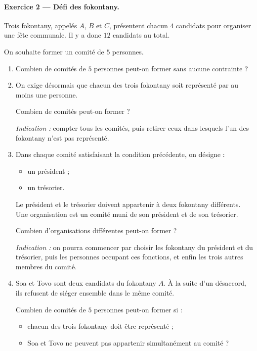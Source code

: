 \paragraph{Exercice 2 --- Défi des fokontany.}
Trois fokontany, appelés \(A\), \(B\) et \(C\), présentent chacun \(4\) candidats
pour organiser une fête communale. Il y a donc \(12\) candidats au total.

On souhaite former un comité de \(5\) personnes.

\begin{enumerate}
    \item Combien de comités de \(5\) personnes peut-on former sans aucune contrainte ?

    \item On exige désormais que chacun des trois fokontany soit représenté
    par au moins une personne.
    
    Combien de comités peut-on former ?
    
    \emph{Indication :} compter tous les comités, puis retirer ceux dans lesquels
    l'un des fokontany n'est pas représenté.

    \item Dans chaque comité satisfaisant la condition précédente, on désigne :
    \begin{itemize}
        \item un président ;
        \item un trésorier.
    \end{itemize}
    
    Le président et le trésorier doivent appartenir à deux fokontany différents.
    Une organisation est un comité muni de son président et de son trésorier.
    
    Combien d'organisations différentes peut-on former ?

    \emph{Indication :} on pourra commencer par choisir les fokontany du président
    et du trésorier, puis les personnes occupant ces fonctions, et enfin les trois
    autres membres du comité.

    \item Soa et Tovo sont deux candidats du fokontany \(A\). À la suite d'un
    désaccord, ils refusent de siéger ensemble dans le même comité.
    
    Combien de comités de \(5\) personnes peut-on former si :
    \begin{itemize}
        \item chacun des trois fokontany doit être représenté ;
        \item Soa et Tovo ne peuvent pas appartenir simultanément au comité ?
    \end{itemize}


\end{enumerate}
